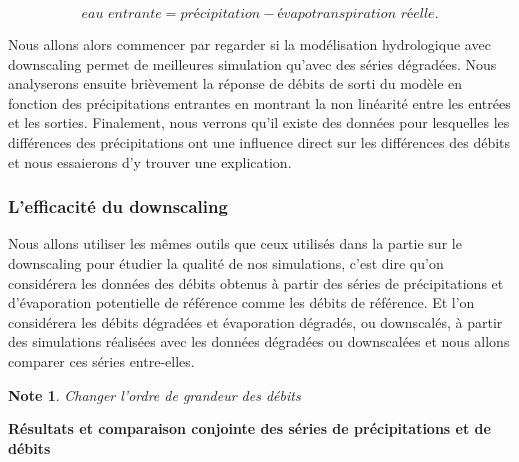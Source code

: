 \documentclass[a4paper,11pt]{article}
\numberwithin{equation}{section}
\newtheorem{note}{Note}
\begin{document}
\[\textit{eau entrante}=\textit{précipitation}-\textit{évapotranspiration réelle}.\]

Nous allons alors commencer par regarder si la modélisation hydrologique avec downscaling permet de meilleures simulation qu'avec des séries dégradées. Nous analyserons ensuite brièvement la réponse de débits de sorti du modèle en fonction des précipitations entrantes en montrant la non linéarité entre les entrées et les sorties. Finalement, nous verrons qu'il existe des données pour lesquelles les différences des précipitations ont une influence direct sur les différences des débits et nous essaierons d'y trouver une explication.
 
\subsubsection{L'efficacité du downscaling}

Nous allons utiliser les mêmes outils que ceux utilisés dans la partie sur le downscaling pour étudier la qualité de nos simulations, c'est dire qu'on considérera les données des débits obtenus à partir des séries de précipitations et d'évaporation potentielle de référence comme les débits de référence. Et l'on considérera les débits dégradées et évaporation dégradés, ou downscalés, à partir des simulations réalisées avec les données dégradées ou downscalées et nous allons comparer ces séries entre-elles. 


\begin{note}
	Changer l'ordre de grandeur des débits
\end{note}

\vspace{0.7 cm}

\noindent\textbf{Résultats et comparaison conjointe des séries de précipitations et de débits}
\end{document}
